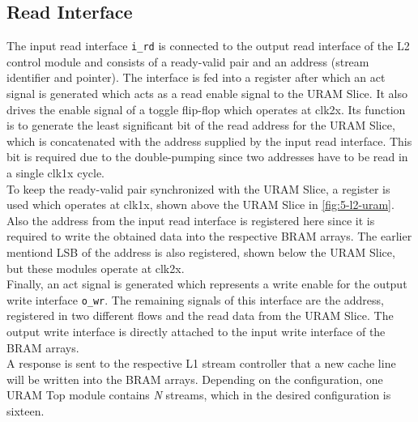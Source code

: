 \subsection{Read Interface}
The input read interface \texttt{i\_rd} is connected to the output read interface of the L2 control module and consists of a ready-valid pair and an address (stream identifier and pointer). The interface is fed into a register after which an act signal is generated which acts as a read enable signal to the URAM Slice. It also drives the enable signal of a toggle flip-flop which operates at clk2x. Its function is to generate the least significant bit of the read address for the URAM Slice, which is concatenated with the address supplied by the input read interface. This bit is required due to the double-pumping since two addresses have to be read in a single clk1x cycle.\\
To keep the ready-valid pair synchronized with the URAM Slice, a register is used which operates at clk1x, shown above the URAM Slice in \autoref{fig:5-l2-uram}. Also the address from the input read interface is registered here since it is required to write the obtained data into the respective BRAM arrays. The earlier mentiond LSB of the address is also registered, shown below the URAM Slice, but these modules operate at clk2x.\\
Finally, an act signal is generated which represents a write enable for the output write interface \texttt{o\_wr}. The remaining signals of this interface are the address, registered in two different flows and the read data from the URAM Slice. The output write interface is directly attached to the input write interface of the BRAM arrays.\\
A response is sent to the respective L1 stream controller that a new cache line will be written into the BRAM arrays. Depending on the configuration, one URAM Top module contains \textit{N} streams, which in the desired configuration is sixteen.








